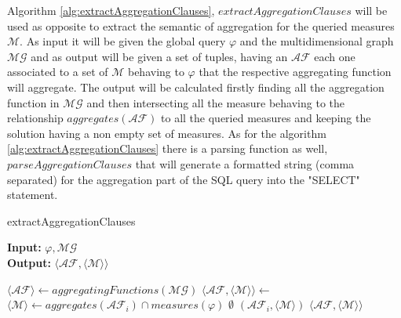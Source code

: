 \documentclass[12pt,a4paper]{report}
\newcommand\globalQuery{\varphi}
\newcommand\measure{\mathcal{M}}
\newcommand\multidimensionalGraph{\mathcal{MG}}
\newcommand\aggregatingFunction{\mathcal{AF}}
\newcommand\aggregatingFunctionFunLabel{aggregates}
\newcommand\measures{measures}
\newcommand\aggregatingFunctions{aggregatingFunctions}
\newcommand\set[1]{\langle #1 \rangle}
\begin{document}
Algorithm \ref{alg:extractAggregationClauses}, $extractAggregationClauses$ will be used as opposite to extract the semantic of aggregation for the queried measures $\measure$.
%
As input it will be given the global query $\globalQuery$ and the multidimensional graph $\multidimensionalGraph$ and as output will be given a set of tuples, having an $\aggregatingFunction$ each one associated to a set of $\measure$ behaving to $\globalQuery$ that the respective aggregating function will aggregate.
%
The output will be calculated firstly finding all the aggregation function in $\multidimensionalGraph$ and then intersecting all the measure behaving to the relationship $\aggregatingFunctionFunLabel(\aggregatingFunction)$ to all the queried measures and keeping the solution having a non empty set of measures.
%
As for the algorithm \ref{alg:extractAggregationClauses} there is a parsing function as well, $parseAggregationClauses$ that will generate a formatted string (comma separated) for the aggregation part of the SQL query into the "SELECT" statement.
%
\begin{algorithm}[ht]
\caption{extractAggregationClauses}\label{alg:extractAggregationClauses}
\textbf{Input:} $\globalQuery,\multidimensionalGraph$\\
\textbf{Output:} $\langle \aggregatingFunction,\langle \measure \rangle \rangle$
\begin{algorithmic}[1]
\State $ \set{\aggregatingFunction} \gets \aggregatingFunctions(\multidimensionalGraph)$
\State $\langle \aggregatingFunction,\langle \measure \rangle \rangle \gets$
\ForEach {$\aggregatingFunction_{i} \in \set{\aggregatingFunction}$}
    \State $\set{\measure} \gets \aggregatingFunctionFunLabel(\aggregatingFunction_{i}) \cap \measures(\globalQuery)$
    \If{$\set{\measure} \equiv \emptyset$}
        \State $\emptyset$
    \Else
        \State $(\aggregatingFunction_{i}, \set{\measure})$
    \EndIf
\EndFor
\State \Return $\set{\aggregatingFunction,\langle \measure \rangle}$
\end{algorithmic}
\end{algorithm}
\end{document}
